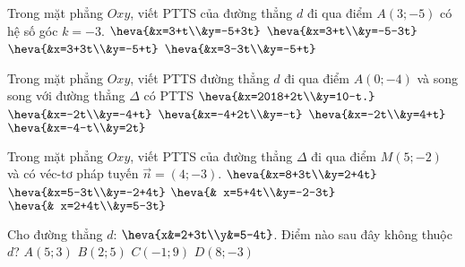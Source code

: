 \begin{ex}%
	Trong mặt phẳng $Oxy$, viết PTTS của đường thẳng $d$ đi qua điểm $A(3;-5)$ có hệ số góc $k=-3$.
	\choice
	{$\heva{&x=3+t\\&y=-5+3t}$}
	{\True$\heva{&x=3+t\\&y=-5-3t}$}
	{$\heva{&x=3+3t\\&y=-5+t}$}
	{$\heva{&x=3-3t\\&y=-5+t}$}
\end{ex}
\begin{ex}%
	Trong mặt phẳng $Oxy$, viết PTTS đường thẳng $d$ đi qua điểm $A(0;-4)$ và song song với đường thẳng $\Delta $ có PTTS $\heva{&x=2018+2t\\&y=10-t.}$
	\choice
	{\True $\heva{&x=-2t\\&y=-4+t}$}
	{$\heva{&x=-4+2t\\&y=-t}$}
	{$\heva{&x=-2t\\&y=4+t}$}
	{$\heva{&x=-4-t\\&y=2t}$}
\end{ex}
\begin{ex}%
	Trong mặt phẳng $Oxy$, viết PTTS của đường thẳng $\Delta$ đi qua điểm $M(5;-2)$ và có véc-tơ pháp tuyến $\overrightarrow{n} =(4;-3)$.
	\choice
	{\True $\heva{&x=8+3t\\&y=2+4t}$}
	{$\heva{&x=5-3t\\&y=-2+4t}$}
	{$\heva{& x=5+4t\\&y=-2-3t}$}
	{$\heva{& x=2+4t\\&y=5-3t}$}
\end{ex}


\begin{ex}%
	Cho đường thẳng $d$: $\heva{x&=2+3t\\y&=5-4t}$. Điểm nào sau đây không thuộc $d$?
	\choice
	{\True $A(5;3)$}
	{$B(2;5)$}
	{$C(-1;9)$}
	{$D(8;-3)$}
\end{ex}


